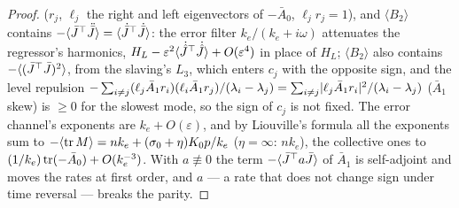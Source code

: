 \begin{proof}
($r_j$, $\ell_j$ the right and left eigenvectors of $-\bar A_0$, $\ell_jr_j = 1$), and $\langle B_2\rangle$ contains
$-\langle\bar J^\top\ddot{\bar J}\rangle = \langle\dot{\bar J}^\top\dot{\bar J}\rangle$: the error filter
$k_e/(k_e + i\omega)$ attenuates the regressor's harmonics,
$H_L - \varepsilon^2\langle\dot{\hat J}^\top\dot{\hat J}\rangle + O(\varepsilon^4)$ in place of $H_L$;
$\langle B_2\rangle$ also contains $-\langle(\bar J^\top\bar J)^2\rangle$, from the slaving's $L_3$, which enters $c_j$
with the opposite sign, and the level repulsion
$-\sum_{i\ne j}(\ell_j\bar A_1r_i)(\ell_i\bar A_1r_j)/(\lambda_i - \lambda_j)
= \sum_{i\ne j}\lvert \ell_j\bar A_1r_i\rvert^2/(\lambda_i - \lambda_j)$ ($\bar A_1$ skew) is $\ge0$ for the slowest mode,
so the sign of $c_j$ is not fixed. The error channel's exponents are $k_e + O(\varepsilon)$, and by Liouville's
formula all the exponents sum to $-\langle\operatorname{tr} M\rangle = nk_e + (\sigma_0 + \eta)K_0p/k_e$ ($\eta = \infty$:
$nk_e$), the collective ones to $(1/k_e)\operatorname{tr}(-\bar A_0) + O(k_e^{-3})$. With $a\not\equiv0$ the term
$-\langle\bar J^\top a\bar J\rangle$ of $\bar A_1$ is self-adjoint and moves the rates at first order, and $a$ --- a
rate that does not change sign under time reversal --- breaks the parity.
\end{proof}
